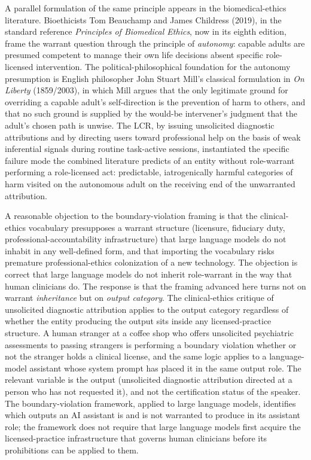 \documentclass[11pt]{article}
\begin{document}
A parallel formulation of the same principle appears in the biomedical-ethics literature. Bioethicists Tom Beauchamp and James Childress (2019), in the standard reference \emph{Principles of Biomedical Ethics}, now in its eighth edition, frame the warrant question through the principle of \emph{autonomy}: capable adults are presumed competent to manage their own life decisions absent specific role-licensed intervention. The political-philosophical foundation for the autonomy presumption is English philosopher John Stuart Mill's classical formulation in \emph{On Liberty} (1859/2003), in which Mill argues that the only legitimate ground for overriding a capable adult's self-direction is the prevention of harm to others, and that no such ground is supplied by the would-be intervener's judgment that the adult's chosen path is unwise. The LCR, by issuing unsolicited diagnostic attributions and by directing users toward professional help on the basis of weak inferential signals during routine task-active sessions, instantiated the specific failure mode the combined literature predicts of an entity without role-warrant performing a role-licensed act: predictable, iatrogenically harmful categories of harm visited on the autonomous adult on the receiving end of the unwarranted attribution.

A reasonable objection to the boundary-violation framing is that the clinical-ethics vocabulary presupposes a warrant structure (licensure, fiduciary duty, professional-accountability infrastructure) that large language models do not inhabit in any well-defined form, and that importing the vocabulary risks premature professional-ethics colonization of a new technology. The objection is correct that large language models do not inherit role-warrant in the way that human clinicians do. The response is that the framing advanced here turns not on warrant \emph{inheritance} but on \emph{output category}. The clinical-ethics critique of unsolicited diagnostic attribution applies to the output category regardless of whether the entity producing the output sits inside any licensed-practice structure. A human stranger at a coffee shop who offers unsolicited psychiatric assessments to passing strangers is performing a boundary violation whether or not the stranger holds a clinical license, and the same logic applies to a language-model assistant whose system prompt has placed it in the same output role. The relevant variable is the output (unsolicited diagnostic attribution directed at a person who has not requested it), and not the certification status of the speaker. The boundary-violation framework, applied to large language models, identifies which outputs an AI assistant is and is not warranted to produce in its assistant role; the framework does not require that large language models first acquire the licensed-practice infrastructure that governs human clinicians before its prohibitions can be applied to them.
\end{document}
